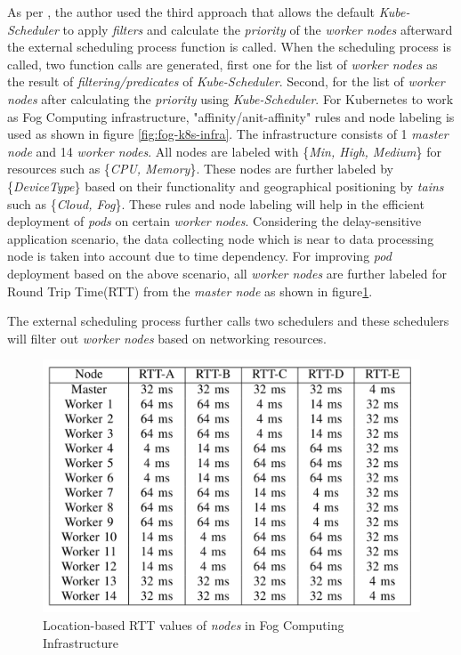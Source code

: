As per \cite{Santos2019}, the author used the third approach that allows the default \emph{Kube-Scheduler} to apply \emph{filters} and calculate the \emph{priority} of the \emph{worker nodes} afterward the external scheduling process function is called\cite{Santos2019}. When the scheduling process is called, two function calls are generated\cite{Santos2019}, first one for the list of \emph{worker nodes} as the result of \emph{filtering/predicates} of \emph{Kube-Scheduler}\cite{Santos2019}. Second, for the list of \emph{worker nodes} after calculating the \emph{priority} using \emph{Kube-Scheduler}\cite{Santos2019}. For Kubernetes to work as Fog Computing infrastructure, "affinity/anit-affinity" rules and node labeling is used as shown in figure \ref{fig:fog-k8s-infra}. The infrastructure consists of 1 \emph{master node} and 14 \emph{worker nodes}. All nodes are labeled with \{\emph{Min, High, Medium}\} for resources such as \{\emph{CPU, Memory}\}\cite{Santos2019}. These nodes are further labeled by \{\emph{DeviceType}\} based on their functionality and geographical positioning by \emph{tains} such as \{\emph{Cloud, Fog}\}\cite{Santos2019}. These rules and node labeling will help in the efficient deployment of \emph{pods} on certain \emph{worker nodes}. Considering the delay-sensitive application scenario, the data collecting node which is near to data processing node is taken into account due to time dependency\cite{Santos2019}. For improving \emph{pod} deployment based on the above scenario, all \emph{worker nodes} are further labeled for Round Trip Time(RTT) from the \emph{master node}\cite{Santos2019} as shown in figure\ref{fig:k8s-rtt}.\par
The external scheduling process further calls two schedulers and these schedulers will filter out \emph{worker nodes} based on networking resources.
\begin{figure}
  \centering
  \includegraphics[width=\linewidth]{figures/mlcn-k8s-rtt.pdf}
  \caption{Location-based RTT values of \emph{nodes} in Fog Computing Infrastructure\cite{Santos2019}}
  \label{fig:k8s-rtt}
\end{figure}
